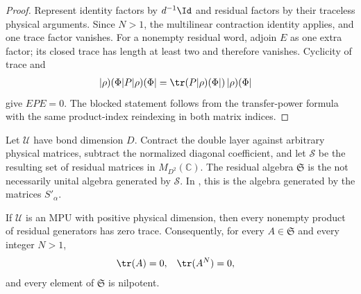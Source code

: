 \begin{proof}\leanok
    Represent identity factors by $d^{-1}\Id$ and residual factors by their
    traceless physical arguments.  Since $N>1$, the multilinear contraction
    identity applies, and one trace factor vanishes.  For a nonempty residual
    word, adjoin $E$ as one extra factor; its closed trace has length at least
    two and therefore vanishes.  Cyclicity of trace and
    \begin{align}
        |\rho)(\Phi|P|\rho)(\Phi|
         & =\tr\!\left(P|\rho)(\Phi|\right)|\rho)(\Phi|
    \end{align}
    give $EPE=0$.  The blocked statement follows from the transfer-power
    formula with the same product-index reindexing in both matrix indices.
\end{proof}

\begin{definition}
    \label{def:mpu_residual_algebra}
    \leanok
    Let $\mathcal U$ have bond dimension $D$.  Contract the double layer
    against arbitrary physical matrices, subtract the normalized diagonal
    coefficient, and let $\mathcal S$ be the resulting set of residual
    matrices in $M_{D^2}(\mathbb C)$.  The residual algebra
    $\mathfrak S$ is the not necessarily unital algebra generated by
    $\mathcal S$.  In \cite[Proposition~III.3(ii)]{Cirac2017MPU}, this is the algebra generated by the matrices
    $S'_\alpha$.
\end{definition}

\begin{lemma}
    \label{thm:mpu_residual_algebra_nilpotent}
    \leanok
    If $\mathcal U$ is an MPU with positive physical dimension, then every
    nonempty product of residual generators has zero trace.  Consequently,
    for every $A\in\mathfrak S$ and every integer $N>1$,
    \begin{align}
        \tr(A) & =0,
               & \tr(A^N) & =0,
    \end{align}
    and every element of $\mathfrak S$ is nilpotent.
\end{lemma}

